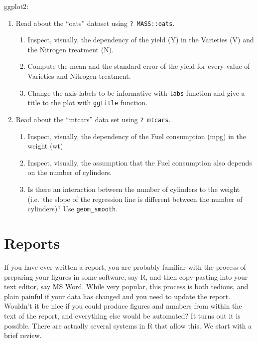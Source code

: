 \documentclass[]{book}
\providecommand{\tightlist}{%
  \setlength{\itemsep}{0pt}\setlength{\parskip}{0pt}}
\theoremstyle{definition}
\theoremstyle{definition}
\theoremstyle{definition}
\theoremstyle{remark}
\begin{document}
ggplot2:

\begin{enumerate}
\def\labelenumi{\arabic{enumi}.}
\tightlist
\item
  Read about the ``oats'' dataset using \texttt{?\ MASS::oats}.

  \begin{enumerate}
  \def\labelenumii{\arabic{enumii}.}
  \tightlist
  \item
    Inspect, visually, the dependency of the yield (Y) in the Varieties
    (V) and the Nitrogen treatment (N).
  \item
    Compute the mean and the standard error of the yield for every value
    of Varieties and Nitrogen treatment.
  \item
    Change the axis labels to be informative with \texttt{labs} function
    and give a title to the plot with \texttt{ggtitle} function.
  \end{enumerate}
\item
  Read about the ``mtcars'' data set using \texttt{?\ mtcars}.

  \begin{enumerate}
  \def\labelenumii{\arabic{enumii}.}
  \tightlist
  \item
    Inspect, visually, the dependency of the Fuel consumption (mpg) in
    the weight (wt)
  \item
    Inspect, visually, the assumption that the Fuel consumption also
    depends on the number of cylinders.
  \item
    Is there an interaction between the number of cylinders to the
    weight (i.e.~the slope of the regression line is different between
    the number of cylinders)? Use \texttt{geom\_smooth}.
  \end{enumerate}
\end{enumerate}

\chapter{Reports}\label{report}

If you have ever written a report, you are probably familiar with the
process of preparing your figures in some software, say R, and then
copy-pasting into your text editor, say MS Word. While very popular,
this process is both tedious, and plain painful if your data has changed
and you need to update the report. Wouldn't it be nice if you could
produce figures and numbers from within the text of the report, and
everything else would be automated? It turns out it is possible. There
are actually several systems in R that allow this. We start with a brief
review.
\end{document}
